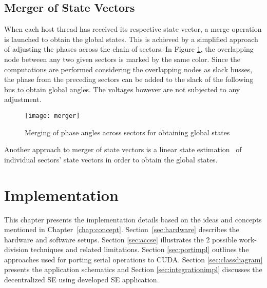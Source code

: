 \documentclass[thesis.tex]{subfiles}
\begin{document}
\section{Merger of State Vectors}\label{merg}
When each host thread has received its respective state vector, a merge operation is launched to obtain the global states. This is achieved by a simplified approach of adjusting the phases across the chain of sectors. In Figure \ref{fig:merger}, the overlapping node between any two given sectors is marked by the same color. Since the computations are performed considering the overlapping nodes as slack busses, the phase from the preceding sectors can be added to the slack of the following bus to obtain global angles. The voltages however are not subjected to any adjustment.
\begin{figure}[H]
	\centering
	\texttt{[image: merger]}
	\caption{Merging of phase angles across sectors for obtaining global states}
	\label{fig:merger}
\end{figure}
Another approach to merger of state vectors is a linear state estimation~\cite{Richter2} of individual sectors' state vectors in order to obtain the global states.



\chapter{Implementation}\label{chap:implementation}
This chapter presents the implementation details based on the ideas and concepts mentioned in Chapter~\ref{chap:concept}. Section~\ref{sec:hardware} describes the hardware and software setups. Section \ref{sec:accse} illustrates the 2 possible work-division techniques and related limitations. Section \ref{sec:portimpl} outlines the approaches used for porting serial operations to CUDA. Section \ref{sec:classdiagram} presents the application schematics and Section \ref{sec:integrationimpl} discusses the decentralized SE using developed SE application.
\end{document}
